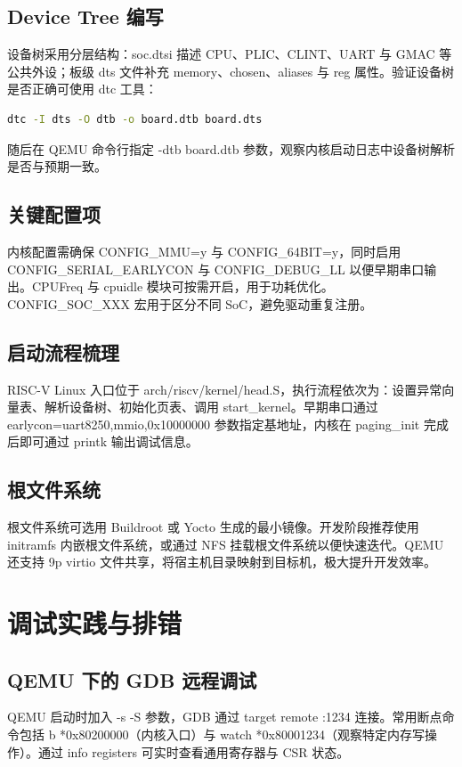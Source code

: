 \section{Device Tree 编写}
设备树采用分层结构：soc.dtsi 描述 CPU、PLIC、CLINT、UART 与 GMAC 等公共外设；板级 dts 文件补充 memory、chosen、aliases 与 reg 属性。验证设备树是否正确可使用 dtc 工具：\par
\begin{lstlisting}[language=sh]
dtc -I dts -O dtb -o board.dtb board.dts
\end{lstlisting}
随后在 QEMU 命令行指定 -dtb board.dtb 参数，观察内核启动日志中设备树解析是否与预期一致。\par
\section{关键配置项}
内核配置需确保 CONFIG\_{}MMU=y 与 CONFIG\_{}64BIT=y，同时启用 CONFIG\_{}SERIAL\_{}EARLYCON 与 CONFIG\_{}DEBUG\_{}LL 以便早期串口输出。CPUFreq 与 cpuidle 模块可按需开启，用于功耗优化。CONFIG\_{}SOC\_{}XXX 宏用于区分不同 SoC，避免驱动重复注册。\par
\section{启动流程梳理}
RISC-V Linux 入口位于 arch/riscv/kernel/head.S，执行流程依次为：设置异常向量表、解析设备树、初始化页表、调用 start\_{}kernel。早期串口通过 earlycon=uart8250,mmio,0x10000000 参数指定基地址，内核在 paging\_{}init 完成后即可通过 printk 输出调试信息。\par
\section{根文件系统}
根文件系统可选用 Buildroot 或 Yocto 生成的最小镜像。开发阶段推荐使用 initramfs 内嵌根文件系统，或通过 NFS 挂载根文件系统以便快速迭代。QEMU 还支持 9p virtio 文件共享，将宿主机目录映射到目标机，极大提升开发效率。\par
\chapter{调试实践与排错}
\section{QEMU 下的 GDB 远程调试}
QEMU 启动时加入 -s -S 参数，GDB 通过 target remote :1234 连接。常用断点命令包括 b *0x80200000（内核入口）与 watch *0x80001234（观察特定内存写操作）。通过 info registers 可实时查看通用寄存器与 CSR 状态。\par
